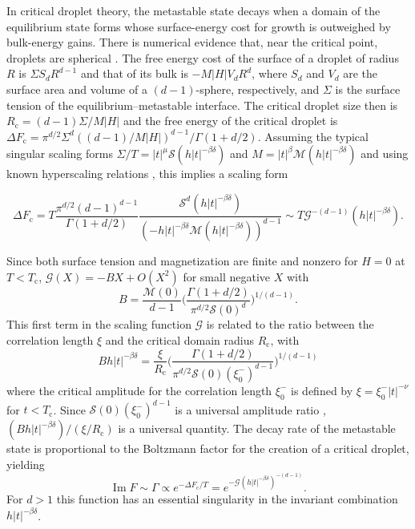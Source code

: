 \documentclass[aps,prl,reprint]{revtex4-1}
\def\[{\begin{equation}}
\def\]{\end{equation}}
\def\im{\mathop{\mathrm{Im}}\nolimits}
\def\O{O}          %
\def\c{\mathrm c}
\def\fM{\mathcal M}  %
\def\fS{\mathcal S}  %
\def\fG{\mathcal G}  %
\def\dim{d}
\newif\ifreprint
\begin{document}
In critical droplet theory, the metastable state decays when a domain of the
equilibrium state forms whose surface-energy cost for growth is outweighed by
bulk-energy gains. There is numerical evidence that, near the critical point,
droplets are spherical \cite{gunther.1993.transfer-matrix}. The free energy
cost of the surface of a droplet of radius $R$ is $\Sigma S_\dim R^{\dim-1}$
and that of its bulk is $-M|H|V_\dim R^\dim$, where $S_\dim$ and $V_\dim$ are
the surface area and volume of a $(\dim-1)$-sphere, respectively, and $\Sigma$
is the surface tension of the equilibrium--metastable interface. The critical
droplet size then is $R_\c=(\dim-1)\Sigma/M|H|$ and the free energy of the
critical droplet is $\Delta
F_\c=\pi^{\dim/2}\Sigma^\dim((\dim-1)/M|H|)^{\dim-1}/\Gamma(1+\dim/2)$.
Assuming the typical singular scaling forms
$\Sigma/T=|t|^\mu\fS(h|t|^{-\beta\delta})$ and $M=|t|^\beta\mathcal
M(h|t|^{-\beta\delta})$ and using known hyperscaling relations
\cite{widom.1981.interface}, this implies a scaling form
\def\eqcritformone{
  T\frac{\pi^{\dim/2}(\dim-1)^{\dim-1}}{\Gamma(1+\dim/2)}
    \frac{\fS^\dim(h|t|^{-\beta\delta})}{(-h|t|^{-\beta\delta}
    \fM(h|t|^{-\beta\delta}))^{\dim-1}}
}
\def\eqcritformtwo{
  T\fG^{-(\dim-1)}(h|t|^{-\beta\delta})
}
\ifreprint
\[
  \begin{aligned}
    \Delta F_\c
    &=\eqcritformone\\
    &\sim\eqcritformtwo.
  \end{aligned}
\]
\else
\[
  \Delta F_\c=\eqcritformone\sim\eqcritformtwo.
\]
\fi
Since both surface tension and magnetization are finite and nonzero for $H=0$
at $T<T_\c$, $\fG(X)=-BX+\O(X^2)$ for small negative $X$ with
\[
  B=\frac{\fM(0)}{\dim-1}\bigg(\frac{\Gamma(1+\dim/2)}
    {\pi^{\dim/2}\fS(0)^\dim}\bigg)^{1/(\dim-1)}.
\]
This first term in the scaling function $\fG$ is related to the ratio between
the correlation length $\xi$ and the critical domain radius $R_\c$, with
\[
  Bh|t|^{-\beta\delta}
  =\frac\xi{R_\c}\bigg(\frac{\Gamma(1+\dim/2)}
    {\pi^{\dim/2}\fS(0)(\xi_0^-)^{\dim-1}}\bigg)^{1/(\dim-1)}
\]
where the critical amplitude for the correlation length $\xi_0^-$ is defined
by $\xi=\xi_0^-|t|^{-\nu}$ for $t<T_\c$. Since $\fS(0)(\xi_0^-)^{\dim-1}$ is a
universal amplitude ratio \cite{zinn.1996.universal},
$(Bh|t|^{-\beta\delta})/(\xi/R_\c)$ is a universal quantity.  The decay rate
of the metastable state is proportional to the Boltzmann factor for the
creation of a critical droplet, yielding
\[
  \im F\sim\Gamma\propto e^{-\Delta F_\c/T}
    =e^{-\fG(h|t|^{-\beta\delta})^{-(\dim-1)}}.
\]
For $d>1$ this function has an essential singularity in the invariant
combination $h|t|^{-\beta\delta}$.
\end{document}
